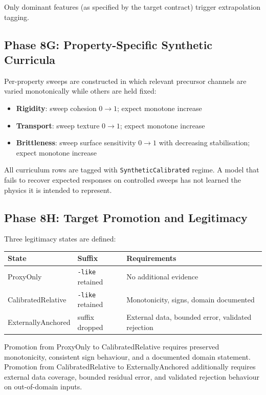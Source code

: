 \documentclass[11pt]{article}
\newcommand{\field}[1]{\texttt{#1}}
\begin{document}
Only dominant features (as specified by the target contract) trigger
extrapolation tagging.

\subsection{Phase 8G: Property-Specific Synthetic Curricula}

Per-property sweeps are constructed in which relevant precursor channels
are varied monotonically while others are held fixed:

\begin{itemize}
  \item \textbf{Rigidity}: sweep cohesion $0 \to 1$; expect monotone increase
  \item \textbf{Transport}: sweep texture $0 \to 1$; expect monotone increase
  \item \textbf{Brittleness}: sweep surface sensitivity $0 \to 1$ with
        decreasing stabilisation; expect monotone increase
\end{itemize}

All curriculum rows are tagged with \field{SyntheticCalibrated} regime.
A model that fails to recover expected responses on controlled sweeps has
not learned the physics it is intended to represent.

\subsection{Phase 8H: Target Promotion and Legitimacy}

Three legitimacy states are defined:

\begin{center}
\begin{tabular}{lll}
\textbf{State} & \textbf{Suffix} & \textbf{Requirements} \\
\hline
ProxyOnly            & \texttt{-like} retained & No additional evidence \\
CalibratedRelative   & \texttt{-like} retained & Monotonicity, signs, domain documented \\
ExternallyAnchored   & suffix dropped           & External data, bounded error, validated rejection \\
\end{tabular}
\end{center}

Promotion from ProxyOnly to CalibratedRelative requires preserved
monotonicity, consistent sign behaviour, and a documented domain statement.
Promotion from CalibratedRelative to ExternallyAnchored additionally
requires external data coverage, bounded residual error, and validated
rejection behaviour on out-of-domain inputs.
\end{document}
